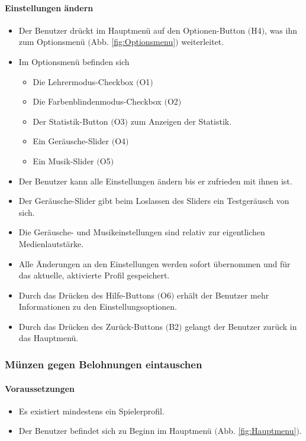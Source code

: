\paragraph{Einstellungen ändern}
\begin{itemize}
	\item Der Benutzer drückt im Hauptmenü auf den Optionen-Button $($H4$)$, was ihn zum Optionsmenü $($Abb. \ref{fig:Optionsmenu}$)$ weiterleitet.
	\item Im Optionsmenü befinden sich
	\begin{itemize}
		\item Die Lehrermodus-Checkbox $($O1$)$
		\item Die Farbenblindenmodus-Checkbox $($O2$)$
		\item Der Statistik-Button $($O3$)$ zum Anzeigen der Statistik.
		\item Ein Geräusche-Slider $($O4$)$
		\item Ein Musik-Slider $($O5$)$
	\end{itemize}
	\item Der Benutzer kann alle Einstellungen ändern bis er zufrieden mit ihnen ist.
	\item Der Geräusche-Slider gibt beim Loslassen des Sliders ein Testgeräusch von sich.
	\item Die Geräusche- und Musikeinstellungen sind relativ zur eigentlichen Medienlautstärke.
	\item Alle Änderungen an den Einstellungen werden sofort übernommen und für das aktuelle, aktivierte Profil gespeichert.
	\item Durch das Drücken des Hilfe-Buttons $($O6$)$ erhält der Benutzer mehr Informationen zu den Einstellungsoptionen.
	\item Durch das Drücken des Zurück-Buttons $($B2$)$ gelangt der Benutzer zurück in das Hauptmenü.
\end{itemize}

\subsubsection{Münzen gegen Belohnungen eintauschen}
\paragraph{Voraussetzungen}
\begin{itemize}
	\item Es existiert mindestens ein Spielerprofil.
	\item Der Benutzer befindet sich zu Beginn im Hauptmenü $($Abb. \ref{fig:Hauptmenu}$)$.
\end{itemize}
